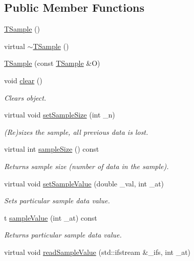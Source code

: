 \subsection*{Public Member Functions}
\begin{DoxyCompactItemize}
\item 
\hyperlink{class_t_sample_ac6b6c37f8145c952122d7145b0174f68}{T\-Sample} ()
\item 
virtual \hyperlink{class_t_sample_a1268ee236a7a68a3ee88642e92c6e26b}{$\sim$\-T\-Sample} ()
\item 
\hyperlink{class_t_sample_a3461a51e2f69b6e6b7e9f857c0ae67ea}{T\-Sample} (const \hyperlink{class_t_sample}{T\-Sample} \&O)
\item 
void \hyperlink{class_t_sample_ad4b1d357361c0f4543a91d929a2b51fa}{clear} ()
\begin{DoxyCompactList}\small\item\em Clears object. \end{DoxyCompactList}\item 
virtual void \hyperlink{class_t_sample_a3b92f468f11169b27a564fd801144fee}{set\-Sample\-Size} (int \-\_\-n)
\begin{DoxyCompactList}\small\item\em (Re)sizes the sample, all previous data is lost. \end{DoxyCompactList}\item 
virtual int \hyperlink{class_t_sample_a188e42364f5afe3ca9cd086130e5ea90}{sample\-Size} () const 
\begin{DoxyCompactList}\small\item\em Returns sample size (number of data in the sample). \end{DoxyCompactList}\item 
virtual void \hyperlink{class_t_sample_a08b273f6f0c4f4229be0b6a1267c98d1}{set\-Sample\-Value} (double \-\_\-val, int \-\_\-at)
\begin{DoxyCompactList}\small\item\em Sets particular sample data value. \end{DoxyCompactList}\item 
t \hyperlink{class_t_sample_ae16d62ea9ba46d853825f325bd53c53a}{sample\-Value} (int \-\_\-at) const 
\begin{DoxyCompactList}\small\item\em Returns particular sample data value. \end{DoxyCompactList}\item 
virtual void \hyperlink{class_t_sample_a7a13ccc3ca57276ad789bafd9ceec1d8}{read\-Sample\-Value} (std\-::ifstream \&\-\_\-ifs, int \-\_\-at)

\end{DoxyCompactItemize}
